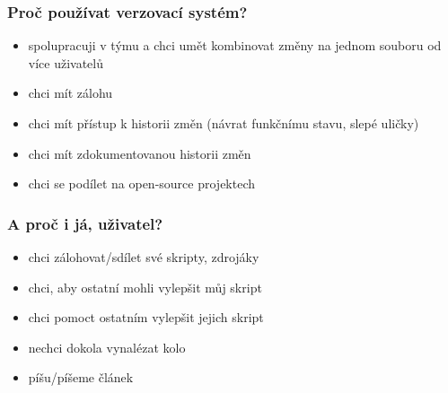 \documentclass[10pt, xcolor=dvipsnames]{beamer} %
\newcommand{\figpath}{../graphics/}
\begin{document}
%   
%         
%     

\begin{frame}
  \frametitle{Proč používat verzovací systém?}
  
  \begin{itemize}
    \setlength\itemsep{10pt}
    \item spolupracuji v týmu a chci umět kombinovat změny na jednom souboru od více uživatelů
    \item chci mít zálohu
    \item chci mít přístup k historii změn (návrat funkčnímu stavu, slepé uličky)
    \item chci mít zdokumentovanou historii změn
    \item chci se podílet na open-source projektech
  \end{itemize}
\end{frame}


\begin{frame}
  \frametitle{A proč i já, uživatel?}
  
  \vspace{10pt}
  \begin{itemize}
    \setlength\itemsep{10pt}
    \item chci zálohovat/sdílet své skripty, zdrojáky
    \item chci, aby ostatní mohli vylepšit můj skript
    \item chci pomoct ostatním vylepšit jejich skript
    \item nechci dokola vynalézat kolo
    \item píšu/píšeme článek
  \end{itemize}
\end{frame}
\end{document}
